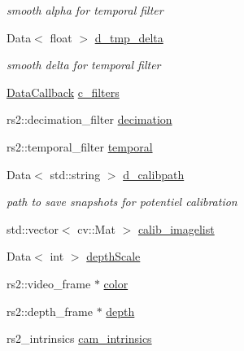 \begin{DoxyCompactItemize}
\begin{DoxyCompactList}\small\item\em smooth alpha for temporal filter \end{DoxyCompactList}\item 
Data$<$ float $>$ \hyperlink{classsofa_1_1rgbdtracking_1_1_real_sense_streamer_a94a20b2db5841706183dfc390cb0f0a0}{d\+\_\+tmp\+\_\+delta}
\begin{DoxyCompactList}\small\item\em smooth delta for temporal filter \end{DoxyCompactList}\item 
\hyperlink{namespacesofa_1_1rgbdtracking_a00834a9204a667746fef9a402ccbfb55}{Data\+Callback} \hyperlink{classsofa_1_1rgbdtracking_1_1_real_sense_streamer_a4bad91d75e9017a902dd2486026c6ed2}{c\+\_\+filters}
\item 
rs2\+::decimation\+\_\+filter \hyperlink{classsofa_1_1rgbdtracking_1_1_real_sense_streamer_ada1b87e2ce15462ff6fa8a5d3e534e9d}{decimation}
\item 
rs2\+::temporal\+\_\+filter \hyperlink{classsofa_1_1rgbdtracking_1_1_real_sense_streamer_a5d843bb669d76146140ddcf22e8e4e03}{temporal}
\item 
Data$<$ std\+::string $>$ \hyperlink{classsofa_1_1rgbdtracking_1_1_real_sense_streamer_a696eba343bf4d7d2f396b7506daab18f}{d\+\_\+calibpath}
\begin{DoxyCompactList}\small\item\em path to save snapshots for potentiel calibration \end{DoxyCompactList}\item 
std\+::vector$<$ cv\+::\+Mat $>$ \hyperlink{classsofa_1_1rgbdtracking_1_1_real_sense_streamer_a01aa309d09c216db55a5596f10740803}{calib\+\_\+imagelist}
\item 
Data$<$ int $>$ \hyperlink{classsofa_1_1rgbdtracking_1_1_real_sense_streamer_a293f222ce3fe93aa62ae0475b714dd0d}{depth\+Scale}
\item 
rs2\+::video\+\_\+frame $\ast$ \hyperlink{classsofa_1_1rgbdtracking_1_1_real_sense_streamer_ac8353a52ed5997b5180bcc99f384c351}{color}
\item 
rs2\+::depth\+\_\+frame $\ast$ \hyperlink{classsofa_1_1rgbdtracking_1_1_real_sense_streamer_ae5a0ca709953b170ffb596abedd51eed}{depth}
\item 
rs2\+\_\+intrinsics \hyperlink{classsofa_1_1rgbdtracking_1_1_real_sense_streamer_a9f25b9a13cfab87d3e9878da5f2b6e32}{cam\+\_\+intrinsics}
\end{DoxyCompactItemize}
